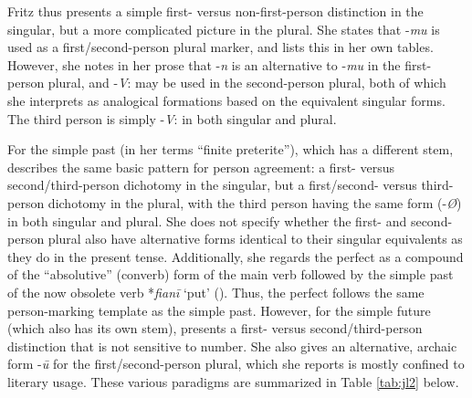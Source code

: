 \documentclass[output=paper]{langsci/langscibook}
\begin{document}
\begin{table}
\caption{Person marking on simple present tense polysyllabic a-stem verbs according to \cite[168--169]{Fritz2002}}
\label{tab:jl1}
\end{table}

Fritz thus presents a simple first- versus non-first-person distinction in the singular, but a more complicated picture in the plural. She states that -\textit{mu} is used as a first/second-person plural marker, and lists this in her own tables. However, she notes in her prose that -\textit{n} is an alternative to -\textit{mu} in the first-person plural, and -\textit{V}: may be used in the second-person plural, both of which she interprets as analogical formations based on the equivalent singular forms. The third person is simply -\textit{V}: in both singular and plural. 

   For the simple past (in her terms “finite preterite”), which has a different stem, \cite[174--176]{Fritz2002} describes the same basic pattern for person agreement: a first- versus second/third-person dichotomy in the singular, but a first/second- versus third-person dichotomy in the plural, with the third person having the same form (-\textit{Ø}) in both singular and plural. She does not specify whether the first- and second-person plural also have alternative forms identical to their singular equivalents as they do in the present tense. Additionally, she regards the perfect as a compound of the “absolutive” (converb) form of the main verb followed by the simple past of the now obsolete verb *\textit{fianī} ‘put’ (\citealt[225--226]{Fritz2002}). Thus, the perfect follows the same person-marking template as the simple past. However, for the simple future (which also has its own stem), \cite[176‒178]{Fritz2002} presents a first- versus second/third-person distinction that is not sensitive to number. She also gives an alternative, archaic form -\textit{ū} for the first/second-person plural, which she reports is mostly confined to literary usage. These various paradigms are summarized in Table \ref{tab:jl2} below.
   
\end{document}
